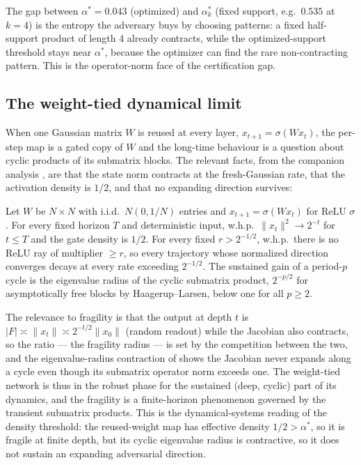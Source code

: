 The gap between $\alpha^*=0.043$ (optimized) and $\alpha^*_k$ (fixed support, e.g.\ $0.535$ at $k=4$)
is the entropy the adversary buys by choosing patterns: a fixed half-support product of length $4$
already contracts, while the optimized-support threshold stays near $\alpha^*$, because the optimizer
can find the rare non-contracting pattern. This is the operator-norm face of the certification gap.

\subsection{The weight-tied dynamical limit}
When one Gaussian matrix $W$ is reused at every layer, $x_{t+1}=\sigma(Wx_t)$, the per-step map is a
gated copy of $W$ and the long-time behaviour is a question about cyclic products of its submatrix
blocks. The relevant facts, from the companion analysis \cite{relumap}, are that the state norm
contracts at the fresh-Gaussian rate, that the activation density is $1/2$, and that no expanding
direction survives:

\begin{proposition}\label{prop:tied}
Let $W$ be $N\times N$ with i.i.d.\ $N(0,1/N)$ entries and $x_{t+1}=\sigma(Wx_t)$ for ReLU $\sigma$.
For every fixed horizon $T$ and deterministic input, w.h.p.\ $\|x_t\|^2\to 2^{-t}$ for $t\le T$ and the
gate density is $1/2$. For every fixed $r>2^{-1/2}$, w.h.p.\ there is no ReLU ray of multiplier
$\ge r$, so every trajectory whose normalized direction converges decays at every rate exceeding
$2^{-1/2}$. The sustained gain of a period-$p$ cycle is the eigenvalue radius of the cyclic submatrix
product, $2^{-p/2}$ for asymptotically free blocks by Haagerup--Larsen, below one for all $p\ge2$.
\end{proposition}

The relevance to fragility is that the output at depth $t$ is $|F|\asymp\|x_t\|\asymp2^{-t/2}\|x_0\|$
(random readout) while the Jacobian also contracts, so the ratio --- the fragility radius --- is set by
the competition between the two, and the eigenvalue-radius contraction of  shows the
Jacobian never expands along a cycle even though its submatrix operator norm exceeds one. The
weight-tied network is thus in the robust phase for the sustained (deep, cyclic) part of its dynamics,
and the fragility is a finite-horizon phenomenon governed by the transient submatrix products. This is
the dynamical-systems reading of the density threshold: the reused-weight map has effective density
$1/2>\alpha^*$, so it is fragile at finite depth, but its cyclic eigenvalue radius is contractive, so it
does not sustain an expanding adversarial direction.

